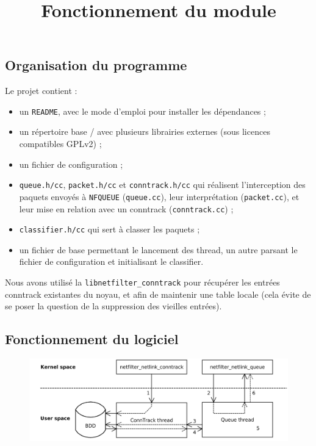 \subsection{Organisation du programme}
Le projet contient :
\begin{itemize}
\item un \verb+README+, avec le mode d'emploi pour installer les dépendances ;
\item un répertoire base / avec plusieurs librairies externes (sous
licences compatibles GPLv2) ;
\item un fichier de configuration ;
\item \verb+queue.h/cc+, \verb+packet.h/cc+ et \verb+conntrack.h/cc+ qui réalisent l'interception des paquets envoyés à \verb+NFQUEUE+ (\verb+queue.cc+), leur
interprétation (\verb+packet.cc+), et leur mise en relation avec un conntrack
(\verb+conntrack.cc+) ;
\item \verb+classifier.h/cc+ qui sert à classer les paquets ;
\item un fichier de base permettant le lancement des thread, un autre parsant le fichier de configuration et initialisant le classifier.
\end{itemize}

Nous avons utilisé la \verb+libnetfilter_conntrack+ pour
récupérer les entrées conntrack existantes du noyau, et afin de maintenir une table locale (cela évite de se poser la question de
la suppression des vieilles entrées).

\subsection{Fonctionnement du logiciel}

\begin{figure}[h]
\centering
\includegraphics[width=\textwidth]{report/schema2.png}\\
\title{Fonctionnement du module}
\end{figure}

